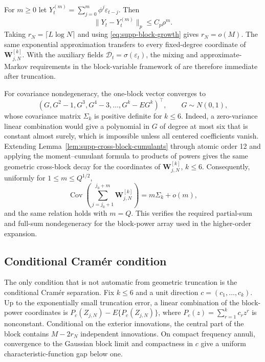 \documentclass[12pt]{article}
\theoremstyle{remark}
\begin{document}
For $m\ge0$ let $Y_t^{(m)}=\sum_{j=0}^m\phi^j\varepsilon_{t-j}$. Then
\[
\|Y_t-Y_t^{(m)}\|_p\le C_p\rho^m.
\]
Taking $r_N=\lceil L\log N\rceil$ and using \eqref{eq:supp-block-growth} gives $r_N=o(M)$. The same exponential approximation transfers to every fixed-degree coordinate of $\mathbf W^{[k]}_{j,N}$. With the auxiliary fields $\mathcal D_t=\sigma(\varepsilon_t)$, the mixing and approximate-Markov requirements in the block-variable framework of \citet{Lahiri:2007} are therefore immediate after truncation.

For covariance nondegeneracy, the one-block vector converges to
\[
(G,G^2-1,G^3,G^4-3,\ldots,G^k-EG^k)^\top,
\qquad G\sim N(0,1),
\]
whose covariance matrix $\Sigma_k$ is positive definite for $k\le6$. Indeed, a zero-variance linear combination would give a polynomial in $G$ of degree at most six that is constant almost surely, which is impossible unless all centered coefficients vanish. Extending Lemma~\ref{lem:supp-cross-block-cumulants} through atomic order 12 and applying the moment--cumulant formula to products of powers gives the same geometric cross-block decay for the coordinates of $\mathbf W^{[k]}_{j,N}$, $k\le6$. Consequently, uniformly for $1\le m\le Q^{1/2}$,
\[
\operatorname{Cov}\left(\sum_{j=j_0+1}^{j_0+m}\mathbf W^{[k]}_{j,N}\right)
=m\Sigma_k+o(m),
\]
and the same relation holds with $m=Q$. This verifies the required partial-sum and full-sum nondegeneracy for the block-power array used in the higher-order expansion.

\subsection{Conditional Cram\'er condition}
The only condition that is not automatic from geometric truncation is the conditional Cram\'er separation. Fix $k\le6$ and a unit direction $c=(c_1,\ldots,c_k)$. Up to the exponentially small truncation error, a linear combination of the block-power coordinates is $P_c(Z_{j,N})-E\{P_c(Z_{j,N})\}$, where $P_c(z)=\sum_{r=1}^k c_rz^r$ is nonconstant. Conditional on the exterior innovations, the central part of the block contains $M-2r_N$ independent innovations. On compact frequency annuli, convergence to the Gaussian block limit and compactness in $c$ give a uniform characteristic-function gap below one.
\end{document}
